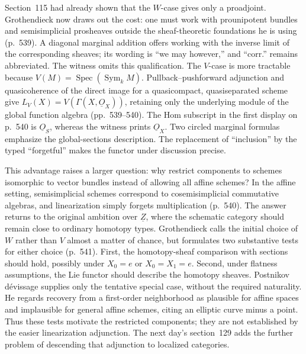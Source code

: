 Section~115 had already shown that the $W$-case gives only a proadjoint. Grothendieck now draws out the cost: one must work with prounipotent bundles and semisimplicial prosheaves outside the sheaf-theoretic foundations he is using (p.~539). A diagonal marginal addition offers working with the inverse limit of the corresponding sheaves; its wording is ``we may however,'' and ``corr.'' remains abbreviated. The witness omits this qualification. The $V$-case is more tractable because $V(M)=\operatorname{Spec}(\operatorname{Sym}_kM)$. Pullback--pushforward adjunction and quasicoherence of the direct image for a quasicompact, quasiseparated scheme give $L_V(X)=V(\Gamma(X,\underline O_X))$, retaining only the underlying module of the global function algebra (pp.~539--540). The Hom subscript in the first display on p.~540 is $\underline O_S$, whereas the witness prints $\underline O_X$. Two circled marginal formulas emphasize the global-sections description. The replacement of ``inclusion'' by the typed ``forgetful'' makes the functor under discussion precise.

This advantage raises a larger question: why restrict components to schemes isomorphic to vector bundles instead of allowing all affine schemes? In the affine setting, semisimplicial schemes correspond to cosemisimplicial commutative algebras, and linearization simply forgets multiplication (p.~540). The answer returns to the original ambition over $\underline Z$, where the schematic category should remain close to ordinary homotopy types. Grothendieck calls the initial choice of $W$ rather than $V$ almost a matter of chance, but formulates two substantive tests for either choice (p.~541). First, the homotopy-sheaf comparison with sections should hold, possibly under $X_0=e$ or $X_0=X_1=e$. Second, under flatness assumptions, the Lie functor should describe the homotopy sheaves. Postnikov d\'evissage supplies only the tentative special case, without the required naturality. He regards recovery from a first-order neighborhood as plausible for affine spaces and implausible for general affine schemes, citing an elliptic curve minus a point. Thus these tests motivate the restricted components; they are not established by the easier linearization adjunction. The next day's section~129 adds the further problem of descending that adjunction to localized categories.

